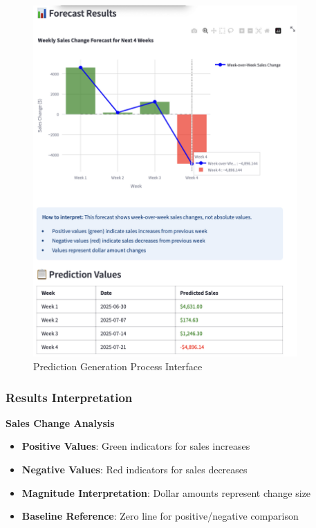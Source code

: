 \begin{figure}[H]
	\centering
	\includegraphics[width=0.9\textwidth]{Images/05ApplicationFunctionsAndFeatures/PredictionGeneration.png}
	\caption{Prediction Generation Process Interface}
	\label{fig:prediction_generation}
\end{figure}

\subsubsection{Results Interpretation}

\textbf{Sales Change Analysis}
\begin{itemize}
	\item \textbf{Positive Values}: Green indicators for sales increases
	\item \textbf{Negative Values}: Red indicators for sales decreases  
	\item \textbf{Magnitude Interpretation}: Dollar amounts represent change size
	\item \textbf{Baseline Reference}: Zero line for positive/negative comparison
\end{itemize}

